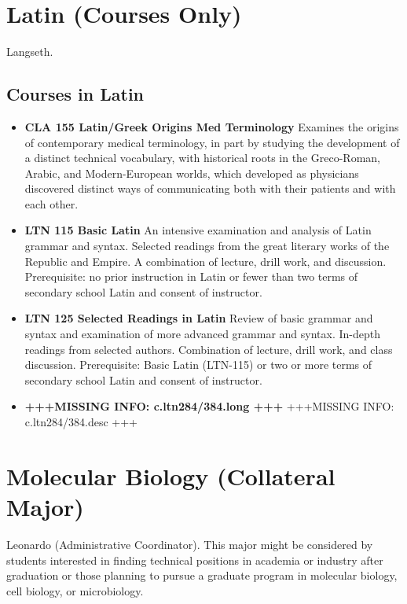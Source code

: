 \documentclass[
  letterpaper,
]{scrbook}
\providecommand{\tightlist}{%
  \setlength{\itemsep}{0pt}\setlength{\parskip}{0pt}}
\begin{document}
\section{Latin (Courses Only)}\label{sec-latin}

Langseth.

\subsection{Courses in Latin}\label{courses-in-latin}

\begin{itemize}
\tightlist
\item
  \textbf{CLA 155 Latin/Greek Origins Med Terminology} Examines the
  origins of contemporary medical terminology, in part by studying the
  development of a distinct technical vocabulary, with historical roots
  in the Greco-Roman, Arabic, and Modern-European worlds, which
  developed as physicians discovered distinct ways of communicating both
  with their patients and with each other.
\item
  \textbf{LTN 115 Basic Latin} An intensive examination and analysis of
  Latin grammar and syntax. Selected readings from the great literary
  works of the Republic and Empire. A combination of lecture, drill
  work, and discussion. Prerequisite: no prior instruction in Latin or
  fewer than two terms of secondary school Latin and consent of
  instructor.
\item
  \textbf{LTN 125 Selected Readings in Latin} Review of basic grammar
  and syntax and examination of more advanced grammar and syntax.
  In-depth readings from selected authors. Combination of lecture, drill
  work, and class discussion. Prerequisite: Basic Latin (LTN-115) or two
  or more terms of secondary school Latin and consent of instructor.
\item
  \textbf{+++MISSING INFO: c.ltn284/384.long +++} +++MISSING INFO:
  c.ltn284/384.desc +++
\end{itemize}

\section{Molecular Biology (Collateral
Major)}\label{sec-molecular-biology}

Leonardo (Administrative Coordinator). This major might be considered by
students interested in finding technical positions in academia or
industry after graduation or those planning to pursue a graduate program
in molecular biology, cell biology, or microbiology.
\end{document}
